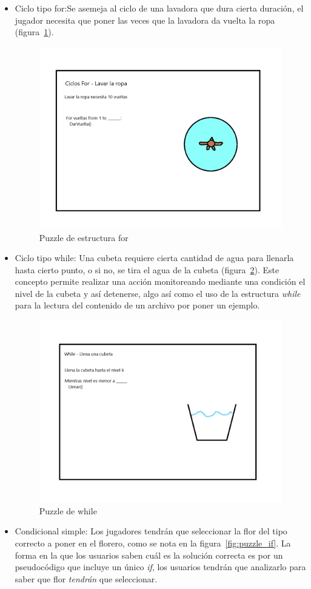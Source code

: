 \begin{itemize}
    \item Ciclo tipo for:Se asemeja al ciclo de una lavadora que dura cierta duración, el jugador necesita que poner las veces que la lavadora da vuelta la ropa (figura~\ref{fig:puzzle_for}).
    \begin{figure}[H]
        \centering
        \includegraphics[width=0.5\linewidth]{images/PuzzleFor.png}
        \caption{Puzzle de estructura for}
        \label{fig:puzzle_for}
    \end{figure}
    \item Ciclo tipo while: Una cubeta requiere cierta cantidad de agua para llenarla hasta cierto punto, o si no, se tira el agua de la cubeta (figura~\ref{fig:while_puzzle}). Este concepto permite realizar una acción monitoreando mediante una condición el nivel de la cubeta y así detenerse, algo así como el uso de la estructura \textit{while} para la lectura del contenido de un archivo por poner un ejemplo.
        \begin{figure}[H]
            \centering
            \includegraphics[width=0.5\linewidth]{images/WhilePuzzle.png}
            \caption{Puzzle de while}
            \label{fig:while_puzzle}
        \end{figure}
    \item Condicional simple: Los jugadores tendrán que seleccionar la flor del tipo correcto a poner en el florero, como se nota en la figura~\ref{fig:puzzle_if}. La forma en la que los usuarios saben cuál es la solución correcta es por un pseudocódigo que incluye un único \textit{if}, los usuarios tendrán que analizarlo para saber que flor \textit{tendrán} que seleccionar.

\end{itemize}
